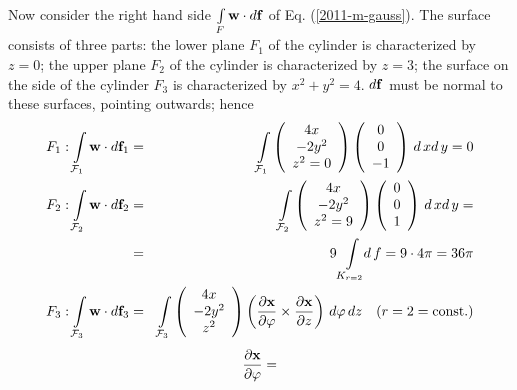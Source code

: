 {\begin{enumerate}
Now consider the right hand side $\int \limits_F {\bf w} \cdot d{\bf f}$
of Eq. (\ref{2011-m-gauss}).
The surface consists of three  parts:
the lower plane $F_1$ of the cylinder is characterized by $z=0$;
the upper plane $F_2$  of the cylinder is characterized by  $z=3$;
the surface on the side of the cylinder $F_3$
 is characterized by   $x^2+y^2=4$.
$d {\bf f}$ must be normal to these surfaces, pointing outwards; hence
 \begin{eqnarray*}
  F_1 : \int \limits_{{\cal F}_1} {\bf w} \cdot d{\bf f}_1  & = &
    \int \limits_{{\cal F}_1}
    \left(
      \begin{array}{c}
        4x \\
        -2y^2 \\
        z^2=0
      \end{array}
    \right)
    \left(
      \begin{array}{c}
        0 \\
        0 \\
        -1
      \end{array}
    \right)
    \, d\, x d\, y = 0 \\
  F_2 : \int \limits_{{\cal F}_2} {\bf w} \cdot d{\bf f}_2 & = &
    \int \limits_{{\cal F}_2}
    \left(
      \begin{array}{c}
        4x \\
        -2y^2 \\
        z^2=9
      \end{array}
    \right)
    \left(
      \begin{array}{c}
        0 \\
        0 \\
        1
      \end{array}
    \right)
    \, d\, x d\, y = \\
  & = & 9 \int \limits_{K_{r=2}} \!\! d\, f=9 \cdot 4 \pi=36 \pi \\
  F_3 : \int \limits_{{\cal F}_3} {\bf w} \cdot d{\bf f}_3 & = &
    \int \limits_{{\cal F}_3}
    \left(
      \begin{array}{c}
        4x \\
        -2y^2 \\
        z^2
      \end{array}
    \right)
    \left(
      \frac{\partial {\bf x}}{\partial \varphi} \times
      \frac{\partial {\bf x}}{\partial z}
    \right)
    \, d\varphi \, dz \quad (r=2=\mbox{const.})
\end{eqnarray*}
$$
  \frac{\partial {\bf x}}{\partial \varphi} =
$$
\end{enumerate}}
